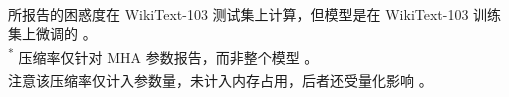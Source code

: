 \begin{table}[!htbp]
\vspace{2pt}
\begin{flushleft}
\footnotesize
\textsuperscript{\textdagger} 所报告的困惑度在 WikiText-103 测试集上计算，但模型是在 WikiText-103 训练集上微调的 \cite{edalati2021kroneckergpt}。 \\
\textsuperscript{*} 压缩率仅针对 MHA 参数报告，而非整个模型 \cite{gu2025tensorllm}。 \\
\textsuperscript{\textsection} 注意该压缩率仅计入参数量，未计入内存占用，后者还受量化影响 \cite{compactifai}。
\end{flushleft}
\end{table}

